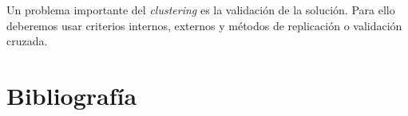 \documentclass[a4paper, 20pt]{article}
\begin{document}
Un problema importante del \textit{clustering} es la validación de la solución. Para ello deberemos usar criterios internos, externos y métodos de replicación o validación cruzada.

\section{Bibliografía}
\nocite{*}


\end{document}
